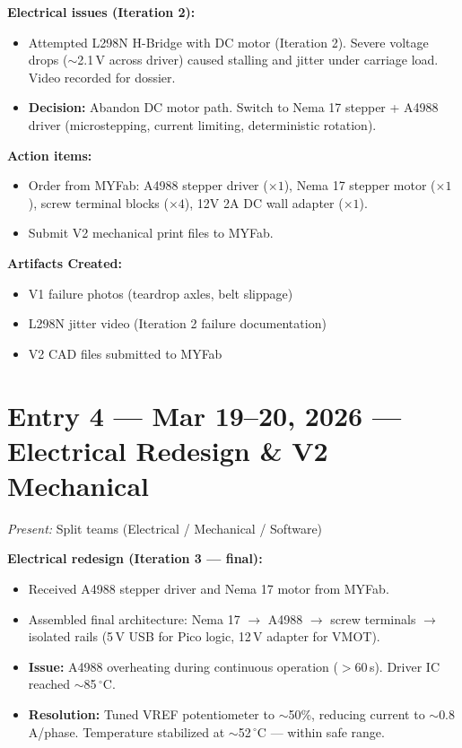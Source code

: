 \documentclass[12pt, letterpaper]{article}
\newcommand{\logentry}[2]{%
  \section{#1}%
  \textit{Present:} #2\par\vspace{1pt}%
}
\newcommand{\artifacts}{\par\vspace{1pt}\textbf{Artifacts Created:}\vspace{0pt}}
\begin{document}
\textbf{Electrical issues (Iteration 2):}
\begin{itemize}
  \item Attempted L298N H-Bridge with DC motor (Iteration 2). Severe voltage drops ($\sim$2.1\,V across driver) caused stalling and jitter under carriage load. Video recorded for dossier.
  \item \textbf{Decision:} Abandon DC motor path. Switch to Nema 17 stepper + A4988 driver (microstepping, current limiting, deterministic rotation).
\end{itemize}

\textbf{Action items:}
\begin{itemize}
  \item Order from MYFab: A4988 stepper driver ($\times 1$), Nema 17 stepper motor ($\times 1$), screw terminal blocks ($\times 4$), 12V 2A DC wall adapter ($\times 1$).
  \item Submit V2 mechanical print files to MYFab.
\end{itemize}

\artifacts
\begin{itemize}
  \item V1 failure photos (teardrop axles, belt slippage)
  \item L298N jitter video (Iteration 2 failure documentation)
  \item V2 CAD files submitted to MYFab
\end{itemize}

\logentry{Entry 4 \textnormal{---} Mar 19--20, 2026 \textnormal{---} Electrical Redesign \& V2 Mechanical}{Split teams (Electrical / Mechanical / Software)}

\textbf{Electrical redesign (Iteration 3 --- final):}
\begin{itemize}
  \item Received A4988 stepper driver and Nema 17 motor from MYFab.
  \item Assembled final architecture: Nema 17 $\rightarrow$ A4988 $\rightarrow$ screw terminals $\rightarrow$ isolated rails (5\,V USB for Pico logic, 12\,V adapter for VMOT).
  \item \textbf{Issue:} A4988 overheating during continuous operation ($>$60\,s). Driver IC reached $\sim$85\,$^\circ$C.
  \item \textbf{Resolution:} Tuned VREF potentiometer to $\sim$50\%, reducing current to $\sim$0.8\,A/phase. Temperature stabilized at $\sim$52\,$^\circ$C --- within safe range.
\end{itemize}
\end{document}
